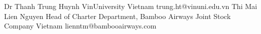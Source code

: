 %
%
%



\begin{referees}
		{Dr Thanh Trung Huynh}
		{VinUniversity}
		{Vietnam}
		{trung.ht@vinuni.edu.vn}
		{}
		{Thi Mai Lien Nguyen}
		{Head of Charter Department, Bamboo Airways Joint Stock Company}
		{Vietnam}
		{lienntm@bambooairways.com}
		{}
\end{referees}